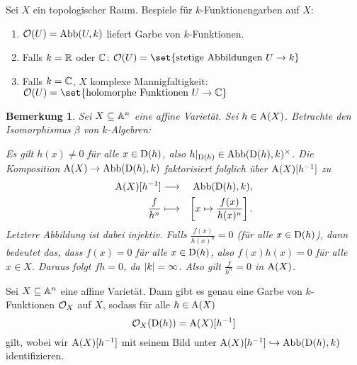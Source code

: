 \documentclass[12pt,a4paper]{scrartcl}
\theoremstyle{cplain}
\theoremstyle{cdef}
\newtheorem{beme}[thmcounter]{Bemerkung}
\begin{document}
\begin{bsp}
	Sei $X$ ein topologischer Raum. Bespiele für $k$-Funktionengarben auf $X$:
	\begin{enumerate}
		\item $\mathcal{O}(U) = \operatorname{Abb}(U,k)$ liefert Garbe von $k$-Funktionen.
		\item Falls $k = \mathbb R$ oder $\mathbb C$: $\Os(U) = \set{\text{stetige Abbildungen }U\to k}$
		\item Falls $k = \mathbb C$, $X$ komplexe Mannigfaltigkeit: $\Os(U) = \set{\text{holomorphe Funktionen }U\to \IC}$
	\end{enumerate}
\end{bsp}
\begin{beme}
	Sei $X\subseteq \mathbb A^n$ eine affine Varietät. Sei $h\in \operatorname{A}(X)$. Betrachte den Isomorphismus $\beta$ von $k$-Algebren:
	\begin{center}
	\end{center}
	Es gilt $h(x) \neq 0$ für alle $x \in\operatorname{D}(h)$, also $h|_{\operatorname{D}(h)} \in \operatorname{Abb}(\operatorname{D}(h), k)^{\times}$. Die Komposition $\operatorname{A}(X)\to \operatorname{Abb}(\operatorname{D}(h), k)$ faktorisiert folglich über $\operatorname{A}(X)[h^{-1}]$ zu \begin{eqnarray*}
		\operatorname{A}(X)[h^{-1}] &\longrightarrow& \operatorname{Abb}(\operatorname{D}(h), k),\\
		\frac{f}{h^n}&\longmapsto& \left[x\mapsto \frac{f(x)}{h(x)^n}\right].
	\end{eqnarray*}
	Letztere Abbildung ist dabei injektiv. Falls $\frac {f(x)}{h(x)^n}  = 0$ (für alle $x\in\operatorname{D}(h)$), dann bedeutet das, dass $f(x) = 0$ für alle $x\in\operatorname{D}(h)$, also $f(x) h(x) = 0$ für alle $x\in X$. Daraus folgt $fh = 0$, da $\lvert k\rvert  = \infty$. Also gilt $\frac{f}{h^n} = 0$ in $\operatorname{A}(X)$. 
\end{beme}

\begin{lem}
	Sei $X\subseteq \mathbb A^n$ eine affine Varietät. Dann gibt es genau eine Garbe von $k$-Funktionen $\mathcal{O}_X$ auf $X$, sodass für alle $h\in \operatorname{A}(X)$ \[\mathcal{O}_X(\operatorname{D}(h)) = \operatorname{A}(X)[h^{-1}]\] gilt, wobei wir $\operatorname{A}(X)[h^{-1}]$ mit seinem Bild unter $\operatorname{A}(X)[h^{-1}]\hookrightarrow \operatorname{Abb}(\operatorname{D}(h), k)$ identifizieren.
\end{lem}



\end{document}
